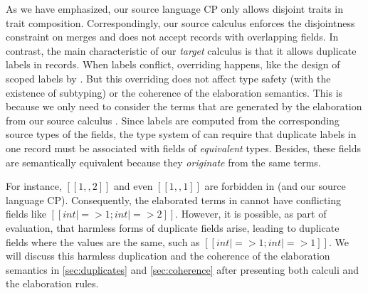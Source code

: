 As we have emphasized, our source language CP only allows disjoint traits in
trait composition. Correspondingly, our source calculus \lambdaiplus enforces
the disjointness constraint on merges and does not accept records with
overlapping fields. In contrast, the main characteristic of our \emph{target}
calculus \lambdar is that it allows duplicate labels in records. When labels
conflict, overriding happens, like the design of scoped labels by
\citet{leijen2005extensible}. But this overriding does not affect type safety
(with the existence of subtyping) or the coherence of the elaboration semantics.
This is because we only need to consider the terms that are generated by the
elaboration from our source calculus \lambdaiplus. Since labels are computed
from the corresponding source types of the fields, the type system of \lambdar
can require that duplicate labels in one record must be associated with fields
of \emph{equivalent} types. Besides, these fields are semantically equivalent
because they \emph{originate} from the same terms.

For instance, $[[1,,2]]$ and even $[[1,,1]]$ are forbidden in \lambdaiplus (and
our source language CP). Consequently, the elaborated terms in \lambdar cannot
have conflicting fields like $[[{int|=>1;int|=>2}]]$. However, it is possible,
as part of evaluation, that harmless forms of duplicate fields arise, leading to
duplicate fields where the values are the same, such as $[[{int|=>1;int|=>1}]]$.
We will discuss this harmless duplication and the coherence of the elaboration
semantics in \autoref{sec:duplicates} and \autoref{sec:coherence} after
presenting both calculi and the elaboration rules.

